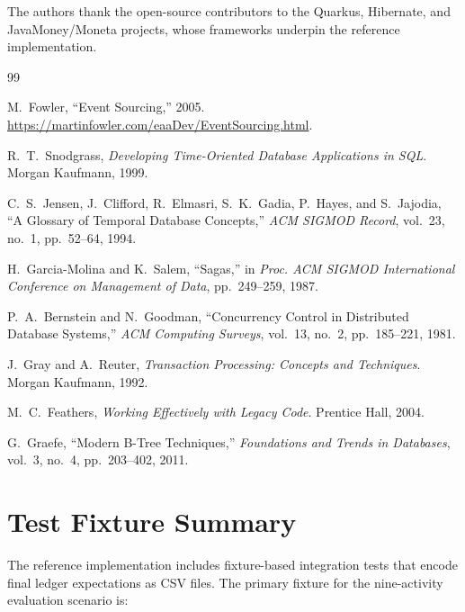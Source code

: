 \documentclass[11pt,letterpaper]{article}
\begin{document}
The authors thank the open-source contributors to the Quarkus,
Hibernate, and JavaMoney/Moneta projects, whose frameworks underpin the
reference implementation.

\begin{thebibliography}{99}

M.~Fowler, ``Event Sourcing,'' 2005.
\url{https://martinfowler.com/eaaDev/EventSourcing.html}.

R.~T.~Snodgrass,
\textit{Developing Time-Oriented Database Applications in SQL}.
Morgan Kaufmann, 1999.

C.~S.~Jensen, J.~Clifford, R.~Elmasri, S.~K.~Gadia, P.~Hayes,
and S.~Jajodia,
``A Glossary of Temporal Database Concepts,''
\textit{ACM SIGMOD Record}, vol.~23, no.~1, pp.~52--64, 1994.

H.~Garcia-Molina and K.~Salem,
``Sagas,''
in \textit{Proc. ACM SIGMOD International Conference on Management of Data},
pp.~249--259, 1987.

P.~A.~Bernstein and N.~Goodman,
``Concurrency Control in Distributed Database Systems,''
\textit{ACM Computing Surveys}, vol.~13, no.~2, pp.~185--221, 1981.

J.~Gray and A.~Reuter,
\textit{Transaction Processing: Concepts and Techniques}.
Morgan Kaufmann, 1992.

M.~C.~Feathers,
\textit{Working Effectively with Legacy Code}.
Prentice Hall, 2004.

G.~Graefe,
``Modern B-Tree Techniques,''
\textit{Foundations and Trends in Databases}, vol.~3, no.~4,
pp.~203--402, 2011.

\end{thebibliography}

\appendix

\section{Test Fixture Summary}

The reference implementation includes fixture-based integration tests
that encode final ledger expectations as CSV files. The primary fixture
for the nine-activity evaluation scenario is:
\end{document}

